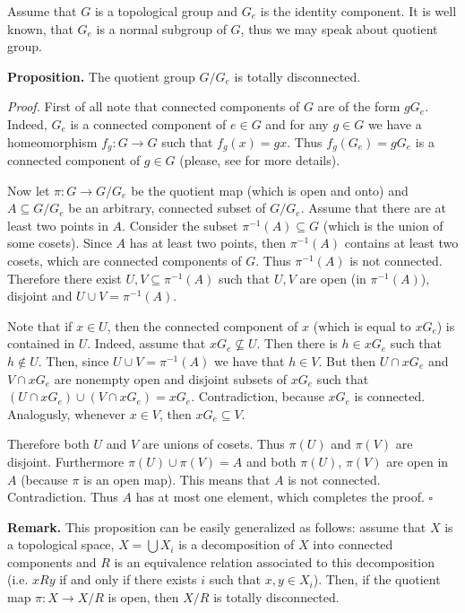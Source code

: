\documentclass[12pt]{article}
\begin{document}
Assume that $G$ is a topological group and $G_{e}$ is the identity component. It is well known, that $G_{e}$ is a normal subgroup of $G$, thus we may speak about quotient group.

\textbf{Proposition.} The quotient group $G/G_{e}$ is totally disconnected.

\textit{Proof.} First of all note that connected components of $G$ are of the form $gG_{e}$. Indeed, $G_{e}$ is a connected component of $e\in G$ and for any $g\in G$ we have a homeomorphism $f_{g}:G\to G$ such that $f_{g}(x)=gx$. Thus $f_{g}(G_{e})=gG_{e}$ is a connected component of $g\in G$ (please, see  for more details).

Now let $\pi:G\to G/G_{e}$ be the quotient map (which is open and onto) and $A\subseteq G/G_{e}$ be an arbitrary, connected subset of $G/G_{e}$. Assume that there are at least two points in $A$. Consider the subset $\pi^{-1}(A)\subseteq G$ (which is the union of some cosets). Since $A$ has at least two points, then $\pi^{-1}(A)$ contains at least two cosets, which are connected components of $G$. Thus $\pi^{-1}(A)$ is not connected. Therefore there exist $U,V\subseteq \pi^{-1}(A)$ such that $U,V$ are open (in $\pi^{-1}(A)$), disjoint and $U\cup V=\pi^{-1}(A)$. 

Note that if $x\in U$, then the connected component of $x$ (which is equal to $xG_{e}$) is contained in $U$. Indeed, assume that $xG_{e}\not\subseteq U$. Then there is $h\in xG_{e}$ such that $h\not\in U$. Then, since $U\cup V=\pi^{-1}(A)$ we have that $h\in V$. But then $U\cap xG_{e}$ and $V\cap xG_{e}$ are nonempty open and disjoint subsets of $xG_{e}$ such that $(U\cap xG_{e})\cup(V\cap xG_{e})=xG_{e}$. Contradiction, because $xG_{e}$ is connected. Analogusly, whenever $x\in V$, then $xG_{e}\subseteq V$.

Therefore both $U$ and $V$ are unions of cosets. Thus $\pi(U)$ and $\pi(V)$ are disjoint. Furthermore $\pi(U)
\cup\pi(V)=A$ and both $\pi(U)$, $\pi(V)$ are open in $A$ (because $\pi$ is an open map). This means that $A$ is not connected. Contradiction. Thus $A$ has at most one element, which completes the proof. $\square$

\textbf{Remark.} This proposition can be easily generalized as follows: assume that $X$ is a topological space, $X=\bigcup X_i$ is a decomposition of $X$ into connected components and $R$ is an equivalence relation associated to this decomposition (i.e. $xRy$ if and only if there exists $i$ such that $x,y\in X_i$). Then, if the quotient map $\pi:X\to X/R$ is open, then $X/R$ is totally disconnected.
\end{document}
